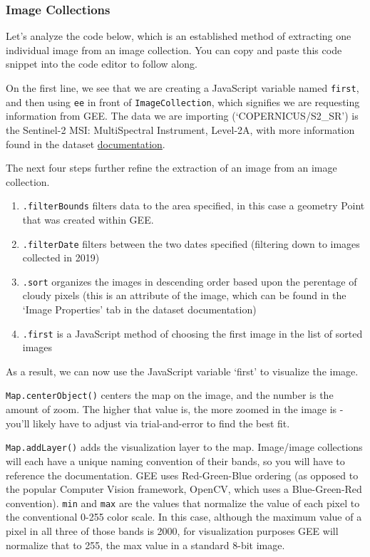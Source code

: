 \documentclass[
]{article}
\providecommand{\tightlist}{%
  \setlength{\itemsep}{0pt}\setlength{\parskip}{0pt}}
\begin{document}
\hypertarget{image-collections}{%
\subsubsection{Image Collections}\label{image-collections}}

Let's analyze the code below, which is an established method of extracting one individual image from an image collection. You can copy and paste this code snippet into the code editor to follow along.

On the first line, we see that we are creating a JavaScript variable named \texttt{first}, and then using \texttt{ee} in front of \texttt{ImageCollection}, which signifies we are requesting information from GEE. The data we are importing (`COPERNICUS/S2\_SR') is the Sentinel-2 MSI: MultiSpectral Instrument, Level-2A, with more information found in the dataset \href{https://developers.google.com/earth-engine/datasets/catalog/COPERNICUS_S2_SR?hl=en\#description}{documentation}.

The next four steps further refine the extraction of an image from an image collection.

\begin{enumerate}
\def\labelenumi{\arabic{enumi}.}
\tightlist
\item
  \texttt{.filterBounds} filters data to the area specified, in this case a geometry Point that was created within GEE.
\item
  \texttt{.filterDate} filters between the two dates specified (filtering down to images collected in 2019)
\item
  \texttt{.sort} organizes the images in descending order based upon the perentage of cloudy pixels (this is an attribute of the image, which can be found in the `Image Properties' tab in the dataset documentation)
\item
  \texttt{.first} is a JavaScript method of choosing the first image in the list of sorted images
\end{enumerate}

As a result, we can now use the JavaScript variable `first' to visualize the image.

\texttt{Map.centerObject()} centers the map on the image, and the number is the amount of zoom. The higher that value is, the more zoomed in the image is - you'll likely have to adjust via trial-and-error to find the best fit.

\texttt{Map.addLayer()} adds the visualization layer to the map. Image/image collections will each have a unique naming convention of their bands, so you will have to reference the documentation. GEE uses Red-Green-Blue ordering (as opposed to the popular Computer Vision framework, OpenCV, which uses a Blue-Green-Red convention). \texttt{min} and \texttt{max} are the values that normalize the value of each pixel to the conventional 0-255 color scale. In this case, although the maximum value of a pixel in all three of those bands is 2000, for visualization purposes GEE will normalize that to 255, the max value in a standard 8-bit image.
\end{document}
